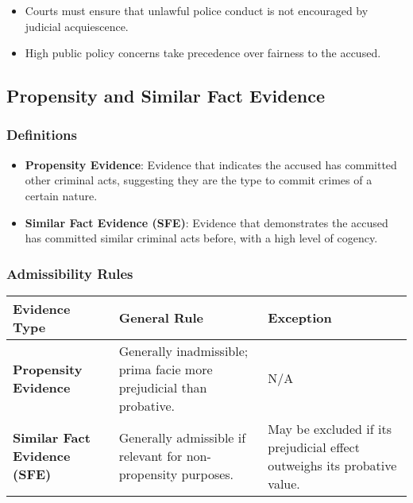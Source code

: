 \begin{itemize}
\tightlist
\item
  Courts must ensure that unlawful police conduct is not encouraged by
  judicial acquiescence.
\item
  High public policy concerns take precedence over fairness to the
  accused.
\end{itemize}

\subsection{  Propensity and Similar Fact
Evidence}\label{propensity-and-similar-fact-evidence}

\subsubsection{Definitions}\label{definitions-3}

\begin{itemize}
\tightlist
\item
  \textbf{Propensity Evidence}: Evidence that indicates the accused has
  committed other criminal acts, suggesting they are the type to commit
  crimes of a certain nature.
\item
  \textbf{Similar Fact Evidence (SFE)}: Evidence that demonstrates the
  accused has committed similar criminal acts before, with a high level
  of cogency.
\end{itemize}

\subsubsection{Admissibility Rules}\label{admissibility-rules}

\begin{longtable}[]{@{}
  >{\raggedright\arraybackslash}p{}
  >{\raggedright\arraybackslash}p{}
  >{\raggedright\arraybackslash}p{}@{}}
\toprule\noalign{}
\begin{minipage}[b]{\linewidth}\raggedright
Evidence Type
\end{minipage} & \begin{minipage}[b]{\linewidth}\raggedright
General Rule
\end{minipage} & \begin{minipage}[b]{\linewidth}\raggedright
Exception
\end{minipage} \\
\midrule\noalign{}
\endhead
\bottomrule\noalign{}
\endlastfoot
\textbf{Propensity Evidence} & Generally inadmissible; prima facie more
prejudicial than probative. & N/A \\
\textbf{Similar Fact Evidence (SFE)} & Generally admissible if relevant
for non-propensity purposes. & May be excluded if its prejudicial effect
outweighs its probative value. \\
\end{longtable}

